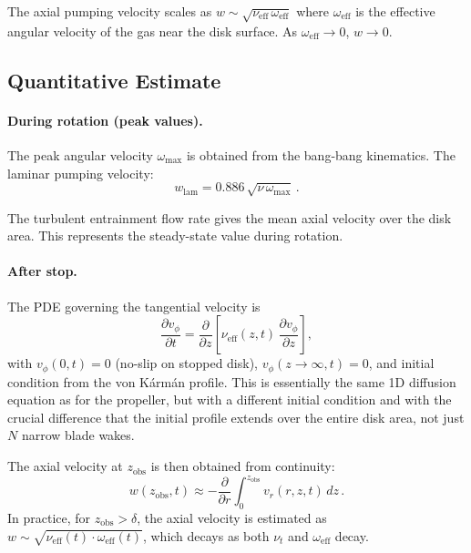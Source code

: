 \documentclass[11pt,a4paper]{article}
\begin{document}
The axial pumping velocity scales as $w \sim \sqrt{\nu_\mathrm{eff}\,
\omega_\mathrm{eff}}$ where $\omega_\mathrm{eff}$ is the effective
angular velocity of the gas near the disk surface. As
$\omega_\mathrm{eff} \to 0$, $w \to 0$.

\subsection{Quantitative Estimate}

\paragraph{During rotation (peak values).}
The peak angular velocity $\omega_\mathrm{max}$ is obtained from the
bang-bang kinematics. The laminar pumping velocity:
\begin{equation}
  w_\mathrm{lam} = 0.886\,\sqrt{\nu\,\omega_\mathrm{max}}\,.
  \label{eq:w_lam_peak}
\end{equation}

The turbulent entrainment flow rate gives the mean axial velocity
over the disk area. This represents the steady-state value during
rotation.

\paragraph{After stop.}
The PDE governing the tangential velocity is
\begin{equation}
  \frac{\partial v_\phi}{\partial t}
  = \frac{\partial}{\partial z}\left[
    \nu_\mathrm{eff}(z,t)\,\frac{\partial v_\phi}{\partial z}
  \right],
  \label{eq:vphi_PDE}
\end{equation}
with $v_\phi(0,t) = 0$ (no-slip on stopped disk),
$v_\phi(z \to \infty, t) = 0$, and initial condition from the
von K\'arm\'an profile. This is essentially the same 1D diffusion
equation as for the propeller, but with a different initial condition
and with the crucial difference that the initial profile extends over
the entire disk area, not just $N$ narrow blade wakes.

The axial velocity at $z_\mathrm{obs}$ is then obtained from continuity:
\begin{equation}
  w(z_\mathrm{obs}, t) \approx -\frac{\partial}{\partial r}
    \int_0^{z_\mathrm{obs}} v_r(r,z,t)\,dz\,.
\end{equation}
In practice, for $z_\mathrm{obs} > \delta$, the axial velocity is
estimated as $w \sim \sqrt{\nu_\mathrm{eff}(t) \cdot
\omega_\mathrm{eff}(t)}$, which decays as both $\nu_t$ and
$\omega_\mathrm{eff}$ decay.
\end{document}
